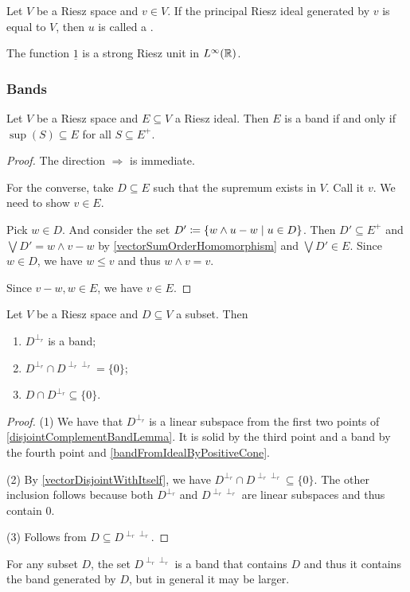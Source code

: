 \begin{definition}
Let $V$ be a Riesz space and $v\in V$. If the principal Riesz ideal generated by $v$ is equal to $V$, then $u$ is called a .
\end{definition}

\begin{example}
The function $\underline{1}$ is a strong Riesz unit in $L^\infty(\mathbb{R})$.
\end{example}

\subsubsection{Bands}

\begin{proposition} \label{bandFromIdealByPositiveCone}
Let $V$ be a Riesz space and $E\subseteq V$ a Riesz ideal. Then $E$ is a band \textup{if and only if} $\sup(S) \subseteq E$ for all $S\subseteq E^+$.
\end{proposition}
\begin{proof}
The direction $\Rightarrow$ is immediate.

For the converse, take $D\subseteq E$ such that the supremum exists in $V$. Call it $v$. We need to show $v\in E$.

Pick $w\in D$. And consider the set $D' \defeq \setbuilder{w\wedge u - w}{u\in D}$. Then $D'\subseteq E^+$ and $\bigvee D' = w\wedge v - w$ by \ref{vectorSumOrderHomomorphism} and $\bigvee D'\in E$. Since $w\in D$, we have $w\leq v$ and thus $w\wedge v = v$.

Since $v-w,w\in E$, we have $v\in E$.
\end{proof}

\begin{lemma} \label{disjointPolarBand}
Let $V$ be a Riesz space and $D\subseteq V$ a subset. Then
\begin{enumerate}
\item $D^{\perp_r}$ is a band;
\item $D^{\perp_r} \cap D^{\perp_r\perp_r} = \{0\}$;
\item $D \cap D^{\perp_r} \subseteq \{0\}$.
\end{enumerate}
\end{lemma}
\begin{proof}
(1) We have that $D^{\perp_r}$ is a linear subspace from the first two points of \ref{disjointComplementBandLemma}. It is solid by the third point and a band by the fourth point and \ref{bandFromIdealByPositiveCone}.

(2) By \ref{vectorDisjointWithItself}, we have $D^{\perp_r} \cap D^{\perp_r\perp_r} \subseteq \{0\}$. The other inclusion follows because both $D^{\perp_r}$ and $D^{\perp_r\perp_r}$ are linear subspaces and thus contain $0$.

(3) Follows from $D\subseteq D^{\perp_r\perp_r}$.
\end{proof}
For any subset $D$, the set $D^{\perp_r\perp_r}$ is a band that contains $D$ and thus it contains the band generated by $D$, but in general it may be larger.

